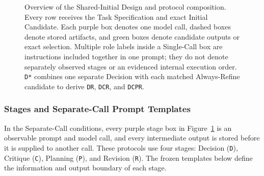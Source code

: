 \begin{figure}[H]
{%
}
\caption{Overview of the Shared-Initial Design and protocol composition. Every row receives the Task Specification and exact Initial Candidate. Each purple box denotes one model call, dashed boxes denote stored artifacts, and green boxes denote candidate outputs or exact selection. Multiple role labels inside a Single-Call box are instructions included together in one prompt; they do not denote separately observed stages or an evidenced internal execution order. \texttt{D*} combines one separate Decision with each matched Always-Refine candidate to derive \texttt{DR}, \texttt{DCR}, and \texttt{DCPR}.}
\label{fig:protocol-overview}
\end{figure}
\unskip

\subsubsection{Stages and Separate-Call Prompt Templates}

In the Separate-Call conditions, every purple stage box in Figure~\ref{fig:protocol-overview} is an observable prompt and model call, and every intermediate output is stored before it is supplied to another call.
These protocols use four stages: Decision (\texttt{D}), Critique (\texttt{C}), Planning (\texttt{P}), and Revision (\texttt{R}).
The frozen templates below define the information and output boundary of each stage.

